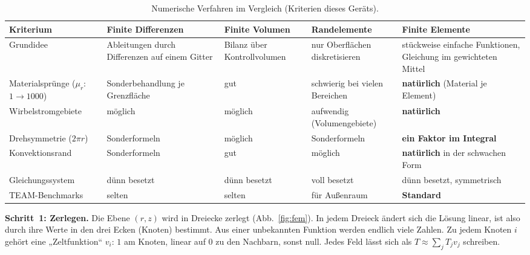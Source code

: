 \documentclass[a4paper, 10pt, conference]{ieeeconf}
\theoremstyle{remark}
\begin{document}
\begin{table}[t]
\centering\footnotesize
\caption{Numerische Verfahren im Vergleich (Kriterien dieses Geräts).}
\label{tab:methods}
\begin{tabularx}{\textwidth}{@{}l X X X X@{}}
\toprule
Kriterium & Finite Differenzen & Finite Volumen & Randelemente & \textbf{Finite Elemente} \\
\midrule
Grundidee & Ableitungen durch Differenzen auf einem Gitter & Bilanz über Kontrollvolumen & nur Oberflächen diskretisieren & stückweise einfache Funktionen, Gleichung im gewichteten Mittel \\
Materialsprünge ($\mu_r$: $1\to1000$) & Sonderbehandlung je Grenzfläche & gut & schwierig bei vielen Bereichen & \textbf{natürlich} (Material je Element) \\
Wirbelstromgebiete & möglich & möglich & aufwendig (Volumengebiete) & \textbf{natürlich} \\
Drehsymmetrie ($2\pi r$) & Sonderformeln & möglich & Sonderformeln & \textbf{ein Faktor im Integral} \\
Konvektionsrand & Sonderformeln & gut & möglich & \textbf{natürlich} in der schwachen Form \\
Gleichungssystem & dünn besetzt & dünn besetzt & voll besetzt & dünn besetzt, symmetrisch \\
TEAM-Benchmarks & selten & selten & für Außenraum & \textbf{Standard}~\cite{team28,biro1989vectorpotential} \\
\bottomrule
\end{tabularx}
\end{table}

\textbf{Schritt~1: Zerlegen.} Die Ebene $(r,z)$ wird in Dreiecke zerlegt
(Abb.~\ref{fig:fem}). In jedem Dreieck ändert sich die Lösung linear, ist
also durch ihre Werte in den drei Ecken (Knoten) bestimmt. Aus einer
unbekannten Funktion werden endlich viele Zahlen. Zu jedem Knoten $i$ gehört
eine „Zeltfunktion“ $v_i$: $1$ am Knoten, linear auf $0$ zu den Nachbarn,
sonst null. Jedes Feld lässt sich als $T\approx\sum_jT_jv_j$ schreiben.
\end{document}
